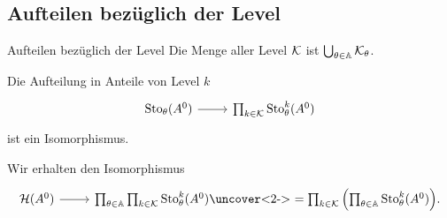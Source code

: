 \subsection{Aufteilen bezüglich der Level}
\begin{frame}[fragile]{Aufteilen bezüglich der Level}
  Die Menge aller Level $\mathcal{K}$ ist $\bigcup_{\theta\in\mathbb{A}}\mathcal{K}_\theta$.
  \begin{lem}
    Die Aufteilung in \openautoquote{}Anteile von Level $k$\closeautoquote{}
    \[\begin{tikzcd}[row sep=0cm]
        \Sto_\theta(A^0) \rar &
        \prod_{k\in\cK}\Sto_\theta^k(A^0)
    \end{tikzcd}\]
    ist ein Isomorphismus.
  \end{lem}
    \begin{cor}
      Wir erhalten den Isomorphismus
      \[\begin{tikzcd}
          \cH(A^0) \rar &
          \prod_{\theta\in\A}\prod_{k\in\cK}\Sto_\theta^k(A^0)
          \!\!
          \text{
            \uncover<2->{
              $=\prod_{k\in\cK}\left(\prod_{\theta\in\A}\Sto_\theta^k(A^0)\right)$}.}
        \end{tikzcd}\]
    \end{cor}
\end{frame}
